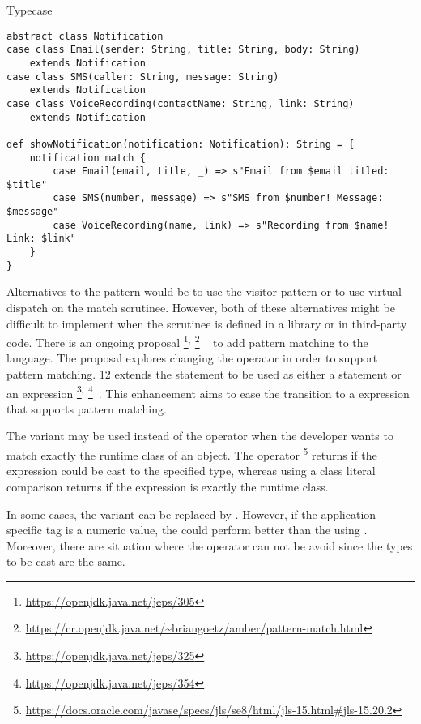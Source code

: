 \begin{pattern}{Typecase}
\begin{verbatim}
abstract class Notification
case class Email(sender: String, title: String, body: String)
	extends Notification
case class SMS(caller: String, message: String)
	extends Notification
case class VoiceRecording(contactName: String, link: String)
	extends Notification

def showNotification(notification: Notification): String = {
	notification match {
		case Email(email, title, _) => s"Email from $email titled: $title"
		case SMS(number, message) => s"SMS from $number! Message: $message"
		case VoiceRecording(name, link) => s"Recording from $name! Link: $link"
	}
}
\end{verbatim}

Alternatives to the \thisp{} pattern would be to use the visitor pattern or to use virtual dispatch on the match scrutinee.
However, both of these alternatives might be difficult to implement when the scrutinee is defined in a library or in third-party code.
There is an ongoing proposal%
\footnote{\url{https://openjdk.java.net/jeps/305}}$^{,}$%
\footnote{\url{https://cr.openjdk.java.net/~briangoetz/amber/pattern-match.html}}%
~\citep{jep305} to add pattern matching to the \java{} language.
The proposal explores changing the  operator in order to support pattern matching.
\java{} 12 extends the  statement to be used as either a statement or an expression%
\footnote{\url{https://openjdk.java.net/jeps/325}}$^{,}$%
\footnote{\url{https://openjdk.java.net/jeps/354}}~\citep{jep325,jep354}.
This enhancement aims to ease the transition to a  expression that supports pattern matching.

The  variant may be used instead of the  operator when the developer wants to match exactly the runtime class of an object.
The  operator%
\footnote{\url{https://docs.oracle.com/javase/specs/jls/se8/html/jls-15.html\#jls-15.20.2}}
returns  if the expression could be cast to the specified type,
whereas using a class literal comparison returns  if the expression is exactly the runtime class.

In some cases, the  variant can be replaced by .
However, if the application-specific tag is a numeric value,
the  could perform better than the  using .
Moreover, there are situation where the  operator can not be avoid since the types to be cast are the same.

\end{pattern}